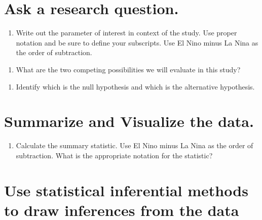 \documentclass[
]{report}
\providecommand{\tightlist}{%
  \setlength{\itemsep}{0pt}\setlength{\parskip}{0pt}}
\begin{document}
\hypertarget{ask-a-research-question.}{%
\section{Ask a research question.}\label{ask-a-research-question.}}

\begin{enumerate}
\def\labelenumi{\arabic{enumi}.}
\setcounter{enumi}{5}
\tightlist
\item
  Write out the parameter of interest in context of the study. Use proper notation and be sure to define your subscripts. Use El Nino minus La Nina as the order of subtraction.
\end{enumerate}

\vspace{1in}

\begin{enumerate}
\def\labelenumi{\arabic{enumi}.}
\setcounter{enumi}{6}
\tightlist
\item
  What are the two competing possibilities we will evaluate in this study?
\end{enumerate}

\vspace{1in}

\begin{enumerate}
\def\labelenumi{\arabic{enumi}.}
\setcounter{enumi}{7}
\tightlist
\item
  Identify which is the null hypothesis and which is the alternative hypothesis.
\end{enumerate}

\vspace{1in}

\hypertarget{summarize-and-visualize-the-data.}{%
\section{Summarize and Visualize the data.}\label{summarize-and-visualize-the-data.}}

\begin{enumerate}
\def\labelenumi{\arabic{enumi}.}
\setcounter{enumi}{8}
\tightlist
\item
  Calculate the summary statistic. Use El Nino minus La Nina as the order of subtraction. What is the appropriate notation for the statistic?
\end{enumerate}

\vspace{0.5in}

\hypertarget{use-statistical-inferential-methods-to-draw-inferences-from-the-data}{%
\section{Use statistical inferential methods to draw inferences from the data}\label{use-statistical-inferential-methods-to-draw-inferences-from-the-data}}
\end{document}
